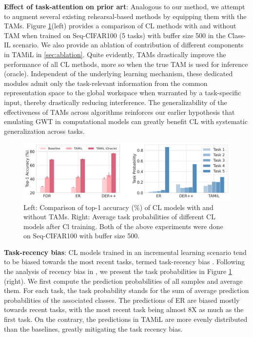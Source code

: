 \documentclass{article} %
\begin{document}
\textbf{Effect of task-attention on prior art}\label{tams_on_prior_art}: 
Analogous to our method, we attempt to augment several existing rehearsal-based methods by equipping them with the TAMs. Figure \ref{fig:combined}(left) provides a comparison of CL methods with and without TAM when trained on Seq-CIFAR100 (5 tasks) with buffer size 500 in the Class-IL scenario. We also provide an ablation of contribution of different components in TAMiL in \ref{sec:ablation}. Quite evidently, TAMs drastically improve the performance of all CL methods, more so when the true TAM is used for inference (oracle).
Independent of the underlying learning mechanism,  these dedicated modules admit only the task-relevant information from the common representation space to the global workspace when warranted by a task-specific input, thereby drastically reducing interference. The generalizability of the effectiveness of TAMs across algorithms reinforces our earlier hypothesis that emulating GWT in computational models can greatly benefit CL with systematic generalization across tasks. 

\begin{figure}[t]
  \centering
  \includegraphics[width=\linewidth]{images/combined.pdf}
  \caption{Left: Comparison of top-1 accuracy ($\%$) of CL models  with and without TAMs. Right: Average task probabilities of different CL models after Cl training. Both of the above experiments were done on Seq-CIFAR100 with buffer size 500.}
  \label{fig:combined}
\end{figure}

\textbf{Task-recency bias}: CL models trained in an incremental learning scenario tend to be biased towards the most recent tasks, termed task-recency bias \citep{hou2019learning}. Following the analysis of recency bias in \citet{buzzega2020dark, arani2022learning}, we present the task probabilities in Figure \ref{fig:combined} (right). We first compute the prediction probabilities of all samples and average them. For each task, the task probability stands for the sum of average prediction probabilities of the associated classes.  The predictions of ER are biased mostly towards recent tasks, with the most recent task being almost 8X as much as the first task. On the contrary, the predictions in TAMiL are more evenly distributed than the baselines, greatly mitigating the task recency bias. 
\end{document}

